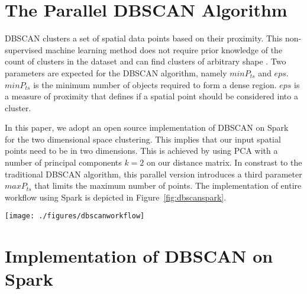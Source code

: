 \section{The Parallel DBSCAN Algorithm}

DBSCAN clusters a set of spatial data points based on their proximity. This non-supervised machine learning method does not require prior knowledge of the count of clusters in the dataset and can find clusters of arbitrary shape \cite{dbscan}. Two parameters are expected for the DBSCAN algorithm, namely $minP_{ts}$ and $eps$. $minP_{ts}$ is the minimum number of objects required to form a dense region. $eps$ is a measure of proximity that defines if a spatial point should be considered into a cluster. 

In this paper, we adopt an open source implementation of DBSCAN on Spark~\cite{irvingdbscan} for the two dimensional space clustering. This implies that our input spatial points need to be in two dimensions. This is achieved by using PCA with a number of principal components $k=2$ on our distance matrix. In constrast to the traditional DBSCAN algorithm, this parallel version introduces a third parameter $maxP_{ts}$ that limits the maximum number of points. The implementation of entire workflow using Spark is depicted in Figure~\ref{fig:dbscanspark}.

\begin{figure*}
	\texttt{[image: ./figures/dbscanworkflow]}
	\caption{Overview of DBSCANs workflow adapted for Spark. The distance matrix is the starting point of our workflow where each cell is the coefficient obtained from the distance function applied to $X_i$ and $X_j$. Then the distance matrix is transformed by PCA. In this case, we keep the first two components. These two components are used as spatial coordinates. Each pair of cells is represented as a point in the spatial plot. Eventually DBSCAN is applied to identify clusters.}
	\label{fig:dbscanspark}
\end{figure*}


\section{Implementation of DBSCAN on Spark}


